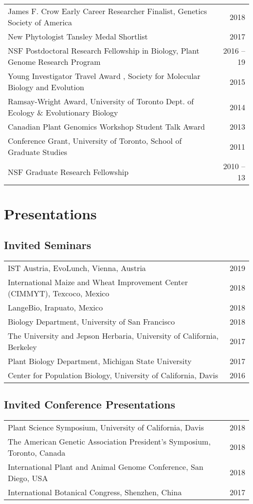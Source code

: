 \documentclass[letterpaper]{article}
\begin{document}
\begin{tabular}{MN}
James F. Crow Early Career Researcher Finalist, Genetics Society of America & 2018 \\
New Phytologist Tansley Medal Shortlist & 2017 \\
NSF Postdoctoral Research Fellowship in Biology, Plant Genome Research Program & 2016 -- 19  \\
Young Investigator Travel Award , Society for Molecular Biology and Evolution &  2015\\
Ramsay-Wright Award, University of Toronto Dept. of Ecology \& Evolutionary Biology & 2014\\
Canadian Plant Genomics Workshop Student Talk Award & 2013 \\
Conference Grant, University of Toronto, School of Graduate Studies  & 2011\\
NSF Graduate Research Fellowship&2010 -- 13
\end{tabular}
\section*{Presentations}
\subsection*{Invited Seminars}
\begin{tabular}{MN}
IST Austria, EvoLunch, Vienna, Austria & 2019 \\ 
International Maize and Wheat Improvement Center (CIMMYT), Texcoco, Mexico & 2018\\
LangeBio, Irapuato, Mexico & 2018 \\
Biology Department, University of San Francisco & 2018\\
The University and Jepson Herbaria, University of California, Berkeley & 2017 \\
Plant Biology Department, Michigan State University & 2017 \\
Center for Population Biology, University of California, Davis & 2016 \\
\end{tabular}

\subsection*{Invited Conference Presentations}
\begin{tabular}{MN}
Plant Science Symposium, University of California, Davis & 2018 \\
The American Genetic Association President's Symposium, Toronto, Canada & 2018\\
International Plant and Animal Genome Conference, San Diego, USA & 2018\\
International Botanical Congress, Shenzhen, China & 2017
\end{tabular}
\end{document}
